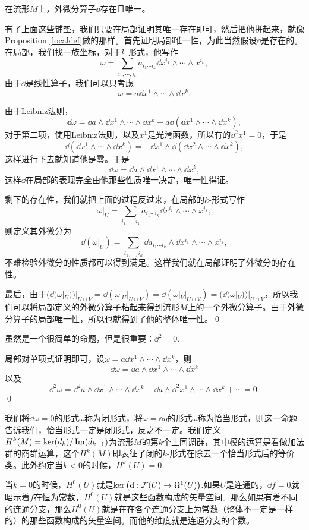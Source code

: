\pro 在流形$M$上，外微分算子$\dd$存在且唯一。

\proof 有了上面这些铺垫，我们只要在局部证明其唯一存在即可，然后把他拼起来，就像Proposition \eqref{localdef}做的那样。首先证明局部唯一性，为此当然假设$\dd$是存在的。在局部，我们找一族坐标，对于$k$-形式，他写作
\[
	\omega=\sum_{i_1,\cdots ,i_k} a_{i_1\cdots i_k}\dd x^{i_{1}}\wedge\cdots\wedge x^{i_{k}},
\]
由于$\dd$是线性算子，我们可以只考虑
\[
	\omega=a\dd x^{1}\wedge\cdots\wedge \dd x^{k}.
\]

由于Leibniz法则，
\[
	\dd \omega=\dd a \wedge \dd x^{1}\wedge\cdots\wedge \dd x^{k}+a\dd(\dd x^{1}\wedge\cdots\wedge \dd x^{k}),
\]
对于第二项，使用Leibniz法则，以及$x^1$是光滑函数，所以有的$\dd^2 x^1=0$，于是
\[
	\dd(\dd x^{1}\wedge\cdots\wedge \dd x^{k})=-\dd x^{1}\wedge\dd(\dd x^{2}\wedge\cdots\wedge \dd x^{k}),
\]
这样进行下去就知道他是零。于是
\[
	\dd \omega=\dd a \wedge \dd x^{1}\wedge\cdots\wedge \dd x^{k},
\]
这样$\dd$在局部的表现完全由他那些性质唯一决定，唯一性得证。

剩下的存在性，我们就把上面的过程反过来，在局部的$k$-形式写作
\[
	\omega|_U=\sum_{i_1,\cdots ,i_k} a_{i_1\cdots i_k}\dd x^{i_{1}}\wedge\cdots\wedge x^{i_{k}},
\]
则定义其外微分为
\[
	\dd(\omega|_U)=\sum_{i_1,\cdots ,i_k} \dd a_{i_1\cdots i_k}\wedge\dd x^{i_{1}}\wedge\cdots\wedge x^{i_{k}},
\]
不难检验外微分的性质都可以得到满足。这样我们就在局部证明了外微分的存在性。

最后，由于$(\dd(\omega|_U))|_{U\cap V}=\dd(\omega|_U|_{U\cap V})=\dd(\omega|_V|_{U\cap V})=(\dd(\omega|_V))|_{U\cap V}$，所以我们可以将局部定义的外微分算子粘起来得到流形$M$上的一个外微分算子。由于外微分算子的局部唯一性，所以也就得到了他的整体唯一性。\qed

\pro 虽然是一个很简单的命题，但是很重要：$\dd^2=0$.

\proof 局部对单项式证明即可，设$\omega=a\dd x^{1}\wedge\cdots\wedge \dd x^{k}$，则
\[
	\dd \omega=\dd a\wedge \dd x^{1}\wedge\cdots\wedge \dd x^{k}
\]
以及
\[
	\dd^2 \omega=\dd^2 a\wedge \dd x^{1}\wedge\cdots\wedge \dd x^{k}-\dd a\wedge \dd^2 x^{1}\wedge\cdots\wedge \dd x^{k}+\cdots=0.
\]
\qed

\para 我们将$\dd \omega=0$的形式$\omega$称为闭形式，将$\omega=\dd \eta$的形式$\omega$称为恰当形式，则这一命题告诉我们，恰当形式一定是闭形式，反之不一定。我们定义$H^k(M)=\ker(d_k)/\operatorname{Im}(d_{k-1})$为流形$M$的第$k$个上同调群，其中模的运算是看做加法群的商群运算，这个$H^k(M)$即表征了闭的$k$-形式在除去一个恰当形式后的等价类。此外约定当$k<0$的时候，$H^k(U)=0$.

当$k=0$的时候，$H^0(U)$就是$\mathrm{ker}\left(\mathrm{d}:\mathcal{F}(U)\to\Omega^1(U)\right)$.如果$U$是连通的，$\dd f=0$就昭示着$f$在恒为常数，$H^0(U)$就是这些函数构成的矢量空间。那么如果有着不同的连通分支，那么$H^0(U)$就是在在各个连通分支上为常数（整体不一定是一样的）的那些函数构成的矢量空间。而他的维度就是连通分支的个数。


